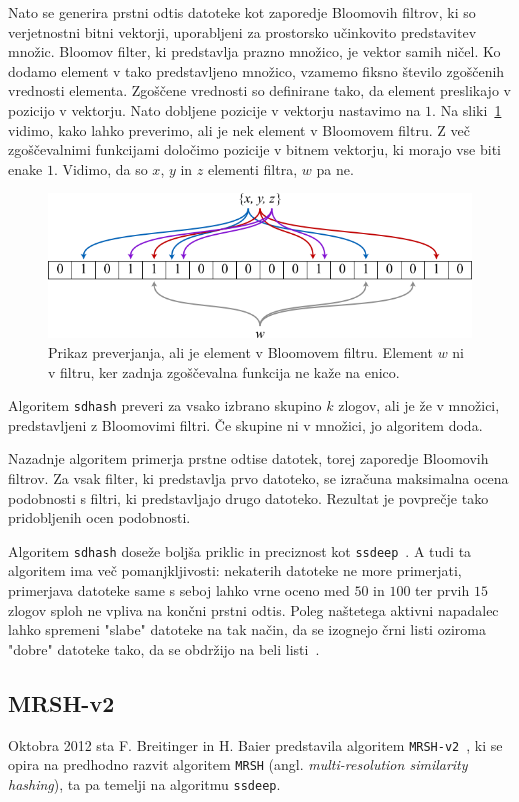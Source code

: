 \documentclass{acm_proc_article-sp}
\begin{document}
Nato se generira prstni odtis datoteke kot zaporedje Bloomovih filtrov, ki so verjetnostni bitni vektorji, uporabljeni za prostorsko učinkovito predstavitev množic. Bloomov filter, ki predstavlja prazno množico, je vektor samih ničel. Ko dodamo element v tako predstavljeno množico, vzamemo fiksno število zgoščenih vrednosti elementa. Zgoščene vrednosti so definirane tako, da element preslikajo v pozicijo v vektorju. Nato dobljene pozicije v vektorju nastavimo na $1$. Na sliki~\ref{bloom} vidimo, kako lahko preverimo, ali je nek element v Bloomovem filtru. Z več zgoščevalnimi funkcijami določimo pozicije v bitnem vektorju, ki morajo vse biti enake $1$. Vidimo, da so $x$, $y$ in $z$ elementi filtra, $w$ pa ne.
\begin{figure}
\centering
\includegraphics[width=\linewidth]{bloom.png}
\caption{Prikaz preverjanja, ali je element v Bloomovem filtru. Element $w$ ni v filtru, ker zadnja zgoščevalna funkcija ne kaže na enico.}
\label{bloom}
\end{figure}
Algoritem \texttt{sdhash} preveri za vsako izbrano skupino $k$ zlogov, ali je že v množici, predstavljeni z Bloomovimi filtri. Če skupine ni v množici, jo algoritem doda.

Nazadnje algoritem primerja prstne odtise datotek, torej zaporedje Bloomovih filtrov. Za vsak filter, ki predstavlja prvo datoteko, se izračuna maksimalna ocena podobnosti s filtri, ki predstavljajo drugo datoteko. Rezultat je povprečje tako pridobljenih ocen podobnosti.

Algoritem \texttt{sdhash} doseže boljša priklic in preciznost kot \texttt{ssdeep}~\cite{fbhash}. A tudi ta algoritem ima več pomanjkljivosti: nekaterih datoteke ne more primerjati, primerjava datoteke same s seboj lahko vrne oceno med $50$ in $100$ ter prvih $15$ zlogov sploh ne vpliva na končni prstni odtis. Poleg naštetega aktivni napadalec lahko spremeni "slabe" datoteke na tak način, da se izognejo črni listi oziroma "dobre" datoteke tako, da se obdržijo na beli listi~\cite{breitinger2012security}.

\subsection{MRSH-v2}
Oktobra 2012 sta F. Breitinger in H. Baier predstavila algoritem \texttt{MRSH-v2}~\cite{mrsh-v2}, ki se opira na predhodno razvit algoritem \texttt{MRSH} (angl. \emph{multi-resolution similarity hashing}), ta pa temelji na algoritmu \texttt{ssdeep}. 
\end{document}
